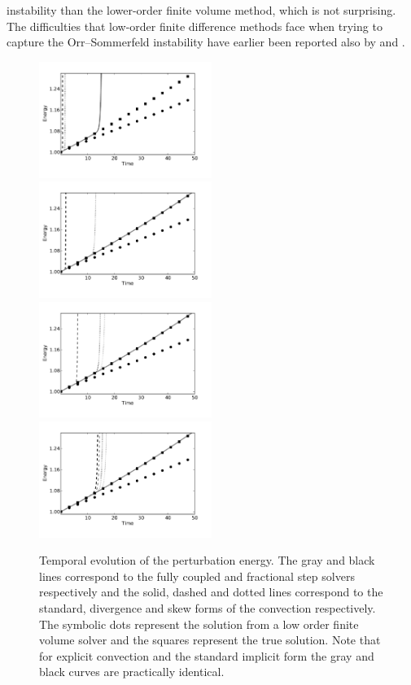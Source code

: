 instability than the lower-order finite volume method, which is
not surprising. The difficulties that low-order finite difference
methods face when trying to capture the Orr--Sommerfeld instability
have earlier been reported also by \citet{MalikZangHussaini1984} and
\citet{CanutoHussainiQuarteroniEtAl2007}.
\begin{figure}
\includegraphics[width=0.5\textwidth]{chapters/mortensen/pdf/OS_energy_cfl_0_1_model_1.pdf}
\includegraphics[width=0.5\textwidth]{chapters/mortensen/pdf/OS_energy_cfl_0_1_model_0.pdf}
\includegraphics[width=0.5\textwidth]{chapters/mortensen/pdf/OS_energy_cfl_0_05_model_1.pdf}
\includegraphics[width=0.5\textwidth]{chapters/mortensen/pdf/OS_energy_cfl_0_05_model_0.pdf}
 \caption{Temporal evolution of the perturbation energy. The gray and
   black lines correspond to the fully coupled and fractional step
   solvers respectively and the solid, dashed and dotted lines
   correspond to the standard, divergence and skew forms of the
   convection respectively. The symbolic dots represent the solution
   from a low order finite volume solver and the squares represent the
   true solution. Note that for explicit convection and the standard
   implicit form the gray and black curves are practically
   identical. }
\label{fig:mortensen:OS_long_time}
\end{figure}

